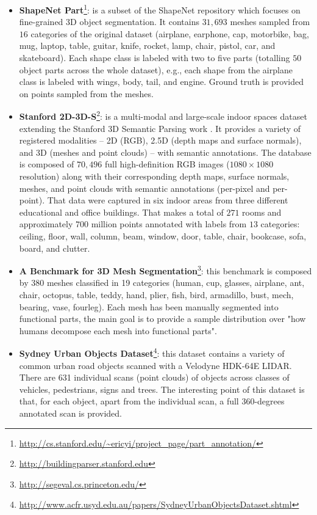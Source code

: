 \begin{itemize}
	\item \textbf{ShapeNet Part}\cite{Yi2016}\footnote{\url{http://cs.stanford.edu/~ericyi/project_page/part_annotation/}}: is a subset of the ShapeNet\cite{Chang2015} repository which focuses on fine-grained 3D object segmentation. It contains $31,693$ meshes sampled from $16$ categories of the original dataset (airplane, earphone, cap, motorbike, bag, mug, laptop, table, guitar, knife, rocket, lamp, chair, pistol, car, and skateboard). Each shape class is labeled with two to five parts (totalling $50$ object parts across the whole dataset), e.g., each shape from the airplane class is labeled with wings, body, tail, and engine. Ground truth is provided on points sampled from the meshes.

	\item \textbf{Stanford 2D-3D-S}\cite{Armeni2017}\footnote{\url{http://buildingparser.stanford.edu}}: is a multi-modal and large-scale indoor spaces dataset extending the Stanford 3D Semantic Parsing work \cite{Armeni2016}. It provides a variety of registered modalities -- 2D (RGB), 2.5D (depth maps and surface normals), and 3D (meshes and point clouds) --  with semantic annotations. The database is composed of $70,496$ full high-definition RGB images ($1080\times1080$ resolution) along with their corresponding depth maps, surface normals, meshes, and point clouds with semantic annotations (per-pixel and per-point). That data were captured in six indoor areas from three different educational and office buildings. That makes a total of $271$ rooms and approximately $700$ million points annotated with labels from $13$ categories: ceiling, floor, wall, column, beam, window, door, table, chair, bookcase, sofa, board, and clutter.

	\item \textbf{A Benchmark for 3D Mesh Segmentation}\cite{Chen:2009:ABF}\footnote{\url{http://segeval.cs.princeton.edu/}}: this benchmark is composed by 380 meshes classified in 19 categories (human, cup, glasses, airplane, ant, chair, octopus, table, teddy, hand, plier, fish, bird, armadillo, bust, mech, bearing, vase, fourleg). Each mesh has been manually segmented into functional parts, the main goal is to provide a sample distribution over "how humans decompose each mesh into functional parts".

	\item \textbf{Sydney Urban Objects Dataset}\cite{quadros2012feature}\footnote{\url{http://www.acfr.usyd.edu.au/papers/SydneyUrbanObjectsDataset.shtml}}: this dataset contains a variety of common urban road objects scanned with a Velodyne HDK-64E LIDAR. There are 631 individual scans (point clouds) of objects across classes of vehicles, pedestrians, signs and trees. The interesting point of this dataset is that, for each object, apart from the individual scan, a full 360-degrees annotated scan is provided.


\end{itemize}
